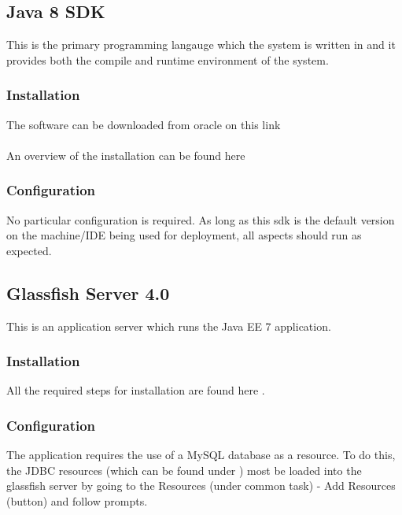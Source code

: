 \documentclass[12pt]{article}
\begin{document}
\subsection{Java 8 SDK}
This is the primary programming langauge which the system is written in and it provides both the compile and runtime environment of the system.
\subsubsection{Installation} 
The software can be downloaded from oracle on this link \textbf{}  \\
\\
An overview of the installation can be found here \textbf{} 
   
\subsubsection{Configuration}
No particular configuration is required. As long as this sdk is the default version on the machine/IDE being used for deployment, all aspects should run as expected.

\subsection{Glassfish Server 4.0}
This is an application server which runs the Java EE 7 application.

\subsubsection{Installation}
All the required steps for installation are found here \textbf{}.  

\subsubsection{Configuration}
The application requires the use of a MySQL database as a resource. To do this, the JDBC resources (which can be found under \textbf{}) most be loaded into the glassfish server by going to the Resources (under common task) - Add Resources (button)  and follow prompts. 
\end{document}

